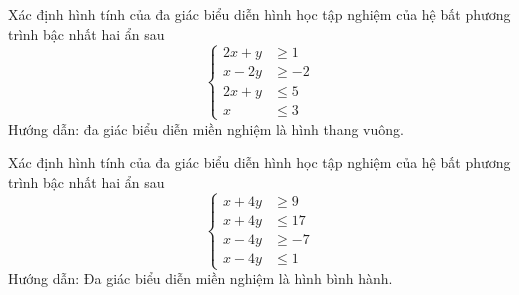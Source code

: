 \begin{bt}%
	Xác định hình tính của đa giác biểu diễn hình học tập nghiệm của hệ bất phương trình bậc nhất hai ẩn sau
	$$\left\{\begin{aligned}
	2x+y &\geq 1\\
	x-2y &\geq -2 \\
	2x+y &\leq 5\\
	x &\leq 3
	\end{aligned}\right.$$
	\loigiai
	{Hướng dẫn: đa giác biểu diễn miền nghiệm là hình thang vuông.
	}
\end{bt}
\begin{bt}%
	Xác định hình tính của đa giác biểu diễn hình học tập nghiệm của hệ bất phương trình bậc nhất hai ẩn sau
	$$\left\{\begin{aligned}
	x+4y &\geq 9\\
	x+4y &\leq 17\\
	x-4y &\geq -7\\
	x-4y &\leq 1
	\end{aligned}\right.$$
	\loigiai
	{Hướng dẫn: Đa giác biểu diễn miền nghiệm là hình bình hành.
	}
\end{bt}


